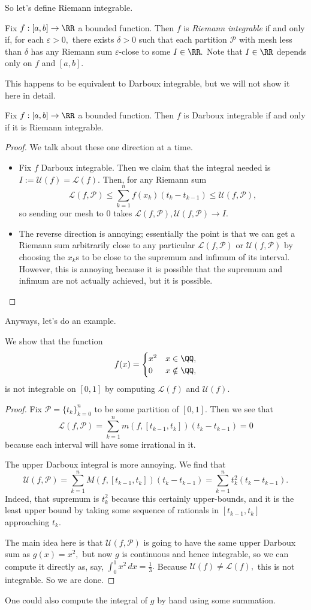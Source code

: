 So let's define Riemann integrable.
\begin{definition}
	Fix $f:[a,b]\to\RR$ a bounded function. Then $f$ is \textit{Riemann integrable} if and only if, for each $\varepsilon>0,$ there exists $\delta>0$ such that each partition $\mathcal P$ with mesh less than $\delta$ has any Riemann sum $\varepsilon$-close to some $I\in\RR.$ Note that $I\in\RR$ depends only on $f$ and $[a,b].$
\end{definition}
This happens to be equivalent to Darboux integrable, but we will not show it here in detail.
\begin{theorem}
	Fix $f:[a,b]\to\RR$ a bounded function. Then $f$ is Darboux integrable if and only if it is Riemann integrable.
\end{theorem}
\begin{proof}
	We talk about these one direction at a time.
	\begin{itemize}
		\item Fix $f$ Darboux integrable. Then we claim that the integral needed is $I:=\mathcal U(f)=\mathcal L(f).$ Then, for any Riemann sum
		\[\mathcal L(f,\mathcal P)\le\sum_{k=1}^nf(x_k)(t_k-t_{k-1})\le\mathcal U(f,\mathcal P),\]
		so sending our mesh to $0$ takes $\mathcal L(f,\mathcal P),\mathcal U(f,\mathcal P)\to I.$
		\item The reverse direction is annoying; essentially the point is that we can get a Riemann sum arbitrarily close to any particular $\mathcal L(f,\mathcal P)$ or $\mathcal U(f,\mathcal P)$ by choosing the $x_k$s to be close to the supremum and infimum of its interval. However, this is annoying because it is possible that the supremum and infimum are not actually achieved, but it is possible.
		\qedhere
	\end{itemize}
\end{proof}
Anyways, let's do an example.
\begin{exe}
	We show that the function
	\[f(x)=\begin{cases}
		x^2 & x \in \QQ, \\
		0 & x\notin\QQ,
	\end{cases}\]
	is not integrable on $[0,1]$ by computing $\mathcal L(f)$ and $\mathcal U(f).$
\end{exe}
\begin{proof}
	Fix $\mathcal P=\{t_k\}_{k=0}^n$ to be some partition of $[0,1].$ Then we see that
	\[\mathcal L(f,\mathcal P)=\sum_{k=1}^nm(f,[t_{k-1},t_k])(t_k-t_{k-1})=0\]
	because each interval will have some irrational in it.

	The upper Darboux integral is more annoying. We find that
	\[\mathcal U(f,\mathcal P)=\sum_{k=1}^nM(f,[t_{k-1},t_k])(t_k-t_{k-1})=\sum_{k=1}^nt_k^2(t_k-t_{k-1}).\]
	Indeed, that supremum is $t_k^2$ because this certainly upper-bounds, and it is the least upper bound by taking some sequence of rationals in $[t_{k-1},t_k]$ approaching $t_k.$

	The main idea here is that $\mathcal U(f,\mathcal P)$ is going to have the same upper Darboux sum as $g(x)=x^2,$ but now $g$ is continuous and hence integrable, so we can compute it directly as, say, $\int_0^1x^2\,dx=\frac13.$ Because $\mathcal U(f)\ne\mathcal L(f),$ this is not integrable. So we are done.
\end{proof}
\begin{remark}
	One could also compute the integral of $g$ by hand using some summation.
\end{remark}